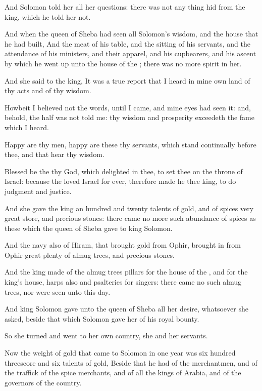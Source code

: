 \verse And Solomon told her all her questions: there was not any thing hid from the king, which he told her not.

\verse And when the queen of Sheba had seen all Solomon's wisdom, and the house that he had built, \verse And the meat of his table, and the sitting of his servants, and the attendance of his ministers, and their apparel, and his cupbearers, and his ascent by which he went up unto the house of the \LORD; there was no more spirit in her.

\verse And she said to the king, It was a true report that I heard in mine own land of thy acts and of thy wisdom.

\verse Howbeit I believed not the words, until I came, and mine eyes had seen it: and, behold, the half was not told me: thy wisdom and prosperity exceedeth the fame which I heard.

\verse Happy are thy men, happy are these thy servants, which stand continually before thee, and that hear thy wisdom.

\verse Blessed be the \LORD thy God, which delighted in thee, to set thee on the throne of Israel: because the \LORD loved Israel for ever, therefore made he thee king, to do judgment and justice.

\verse And she gave the king an hundred and twenty talents of gold, and of spices very great store, and precious stones: there came no more such abundance of spices as these which the queen of Sheba gave to king Solomon.

\verse And the navy also of Hiram, that brought gold from Ophir, brought in from Ophir great plenty of almug trees, and precious stones.

\verse And the king made of the almug trees pillars for the house of the \LORD, and for the king's house, harps also and psalteries for singers: there came no such almug trees, nor were seen unto this day.

\verse And king Solomon gave unto the queen of Sheba all her desire, whatsoever she asked, beside that which Solomon gave her of his royal bounty.

So she turned and went to her own country, she and her servants.

\verse Now the weight of gold that came to Solomon in one year was six hundred threescore and six talents of gold, \verse Beside that he had of the merchantmen, and of the traffick of the spice merchants, and of all the kings of Arabia, and of the governors of the country.

